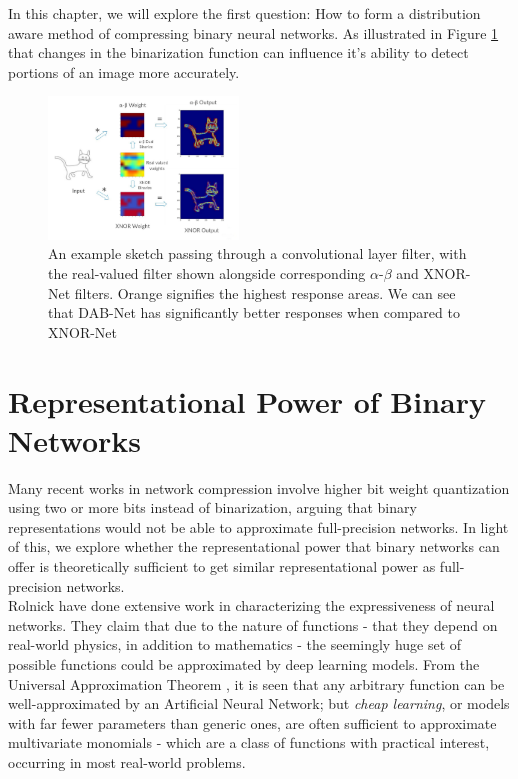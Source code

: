 
\noindent In this chapter, we will explore the first question: How to form a distribution aware method of compressing binary neural networks. As illustrated in Figure \ref{fig:alphabetadiagram} that changes in the binarization function can influence it's ability to detect portions of an image more accurately.

\begin{figure}[h]
\centering
           \includegraphics[width=0.45\textwidth]{figures/MainDiagram-CVPR.pdf}
           \caption{An example sketch passing through a convolutional layer filter, with the real-valued filter shown alongside corresponding $\alpha$-$\beta$ and XNOR-Net filters. Orange signifies the highest response areas. We can see that DAB-Net has significantly better responses when compared to XNOR-Net}
        \label{fig:alphabetadiagram}
\end{figure}

\section{Representational Power of Binary Networks} 

\noindent Many recent works in network compression involve higher bit weight quantization using two or more bits \cite{zhou2017inq,li2016ternary,li2016ternary} instead of binarization, arguing that binary representations would not be able to approximate full-precision networks. In light of this, we explore whether the representational power that binary networks can offer is theoretically sufficient to get similar representational power as full-precision networks.\\

\noindent Rolnick \etal \cite{lin2017does,rolnick2017power} have done extensive work in characterizing the expressiveness of neural networks. They claim that due to the nature of functions - that they depend on real-world physics, in addition to mathematics - the seemingly huge set of possible functions could be approximated by deep learning models. From the Universal Approximation Theorem \cite{cybenko1989approximation}, it is seen that any arbitrary function can be well-approximated by an Artificial Neural Network; but \textit{cheap learning}, or models with far fewer parameters than generic ones, are often sufficient to approximate multivariate monomials - which are a class of functions with practical interest, occurring in most real-world problems.\\

